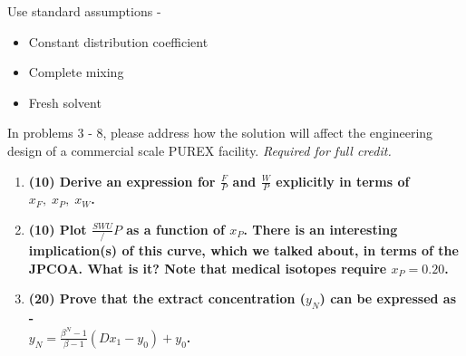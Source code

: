 \documentclass[11pt,a4paper]{article}
\begin{document}
\noindent Use standard assumptions -
\begin{itemize}[leftmargin=*,topsep=0pt,font=\bfseries]
    \item Constant distribution coefficient
    \item Complete mixing
    \item Fresh solvent
\end{itemize}
\vspace{\baselineskip}

\noindent In problems 3 - 8, please address how the solution will affect the engineering design of a commercial scale PUREX facility. \textit{Required for full credit.}

\newpage

\begin{enumerate}[leftmargin=*,topsep=0pt,font=\bfseries]
    \item\textbf{(10) Derive an expression for $\frac{F}{P}$ and $\frac{W}{P}$ explicitly in terms of $x_F, \; x_P, \; x_W$.}
        \vspace{0.25in}\\

        
        
        
        
        
        
        
        
        
        
        
        
        
        
        \newpage 
    \item\textbf{(10) Plot $\frac{SWU}/{P}$ as a function of $x_P$. There is an interesting implication(s) of this curve, which we talked about, in terms of the JPCOA. What is it? Note that medical isotopes require $x_P = 0.20$.}
        \vspace{0.25in}\\

        
        
        
        
        
        
        
        
        
        
        
        
        
        
        \newpage 
    \item\textbf{(20) Prove that the extract concentration ($y_N$) can be expressed as - \\ 
        $y_N = \frac{\beta^N - 1}{\beta - 1}(Dx_1 - y_0)+ y_0$.}
        \vspace{0.25in}\\
    

\end{enumerate}
\end{document}
